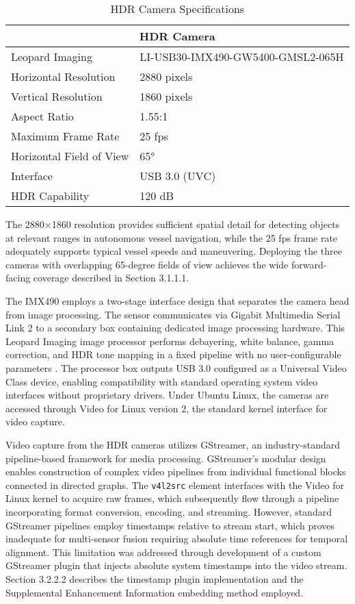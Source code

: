 \documentclass{erauthesis}
\begin{document}
\begin{table}[h]
\centering
\caption{HDR Camera Specifications}
\begin{tabular}{ll}
\hline
\multicolumn{2}{c}{HDR Camera}\\
\hline
\hline
Leopard Imaging & LI-USB30-IMX490-GW5400-GMSL2-065H \\
Horizontal Resolution & 2880 pixels \\
Vertical Resolution & 1860 pixels \\
Aspect Ratio & 1.55:1 \\
Maximum Frame Rate & 25 fps \\
Horizontal Field of View & 65° \\
Interface & USB 3.0 (UVC) \\
HDR Capability & 120 dB \\
\hline
\end{tabular}
\label{tab:hdr_camera_specs}
\end{table}

The 2880×1860 resolution provides sufficient spatial detail for detecting objects at relevant ranges in autonomous vessel navigation, while the 25 fps frame rate adequately supports typical vessel speeds and maneuvering.
Deploying the three cameras with overlapping 65-degree fields of view achieves the wide forward-facing coverage described in Section 3.1.1.1.

The IMX490 employs a two-stage interface design that separates the camera head from image processing.
The sensor communicates via Gigabit Multimedia Serial Link 2 to a secondary box containing dedicated image processing hardware.
This Leopard Imaging image processor performs debayering, white balance, gamma correction, and \ac{HDR} tone mapping in a fixed pipeline with no user-configurable parameters \cite{thompson2023}.
The processor box outputs USB 3.0 configured as a Universal Video Class device, enabling compatibility with standard operating system video interfaces without proprietary drivers.
Under Ubuntu Linux, the cameras are accessed through Video for Linux version 2, the standard kernel interface for video capture.

Video capture from the \ac{HDR} cameras utilizes GStreamer, an industry-standard pipeline-based framework for media processing.
GStreamer's modular design enables construction of complex video pipelines from individual functional blocks connected in directed graphs.
The \texttt{v4l2src} element interfaces with the Video for Linux kernel to acquire raw frames, which subsequently flow through a pipeline incorporating format conversion, encoding, and streaming.
However, standard GStreamer pipelines employ timestamps relative to stream start, which proves inadequate for multi-sensor fusion requiring absolute time references for temporal alignment.
This limitation was addressed through development of a custom GStreamer plugin that injects absolute system timestamps into the video stream.
Section 3.2.2.2 describes the timestamp plugin implementation and the Supplemental Enhancement Information embedding method employed.
\end{document}
